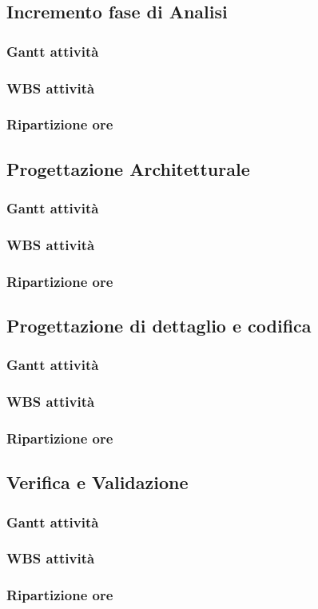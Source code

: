 \subsection{Incremento fase di Analisi}
\subsubsection{Gantt attività}

\subsubsection{WBS attività}

\subsubsection{Ripartizione ore}

\subsection{Progettazione Architetturale}
\subsubsection{Gantt attività}

\subsubsection{WBS attività}

\subsubsection{Ripartizione ore}

\subsection{Progettazione di dettaglio e codifica}
\subsubsection{Gantt attività}

\subsubsection{WBS attività}

\subsubsection{Ripartizione ore}

\subsection{Verifica e Validazione}
\subsubsection{Gantt attività}

\subsubsection{WBS attività}

\subsubsection{Ripartizione ore}